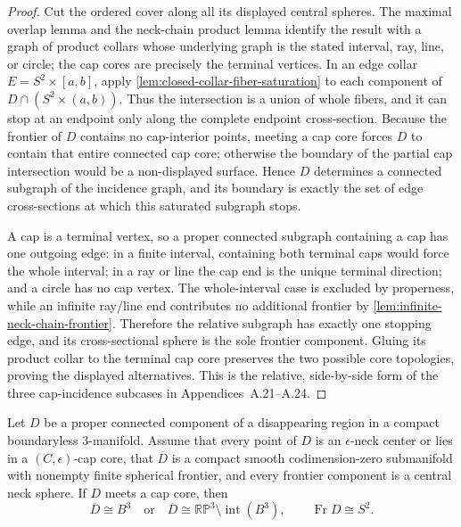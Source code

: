 \begin{proof}
Cut the ordered cover along all its displayed central spheres.  The maximal
overlap lemma and the neck-chain product lemma identify the result with a graph
of product collars whose underlying graph is the stated interval, ray, line,
or circle; the cap cores are precisely the terminal vertices.  In an edge
collar $E=S^2\times[a,b]$, apply
\ref{lem:closed-collar-fiber-saturation} to each component of
$D\cap(S^2\times(a,b))$.  Thus the intersection is a union of whole fibers,
and it can stop at an endpoint only along the complete endpoint cross-section.
Because the frontier of $D$ contains no cap-interior points, meeting a cap core
forces $D$ to contain that entire connected cap core; otherwise the boundary of
the partial cap intersection would be a non-displayed surface.  Hence $D$
determines a connected subgraph of the incidence graph, and its boundary is
exactly the set of edge cross-sections at which this saturated subgraph stops.

A cap is a terminal vertex, so a proper connected subgraph containing a cap
has one outgoing edge: in a finite interval, containing both terminal caps
would force the whole interval; in a ray or line the cap end is the unique
terminal direction; and a circle has no cap vertex.  The whole-interval case
is excluded by properness, while an infinite ray/line end contributes no
additional frontier by \ref{lem:infinite-neck-chain-frontier}.  Therefore the
relative subgraph has exactly one stopping edge, and its cross-sectional
sphere is the sole frontier component.  Gluing its product collar to the
terminal cap core preserves the two possible core topologies, proving the
displayed alternatives.  This is the relative, side-by-side form of the
three cap-incidence subcases in Appendices~A.21--A.24.
\end{proof}

\begin{lemma}
\label{lem:proper-capped-region-classification}
\notready
Let $D$ be a proper connected component of a disappearing region in a compact
boundaryless $3$-manifold.  Assume that every point of $D$ is an
$\epsilon$-neck center or lies in a $(C,\epsilon)$-cap core, that
$\overline D$ is a compact smooth codimension-zero submanifold with nonempty
finite spherical frontier, and every frontier component is a central neck
sphere.  If $D$ meets a cap core, then
\[
 \overline D\cong B^3
 \quad\text{or}\quad
 \overline D\cong\mathbb{RP}^3\setminus\operatorname{int}(B^3),
 \qquad
 \operatorname{Fr}D\cong S^2.
\]
\end{lemma}

